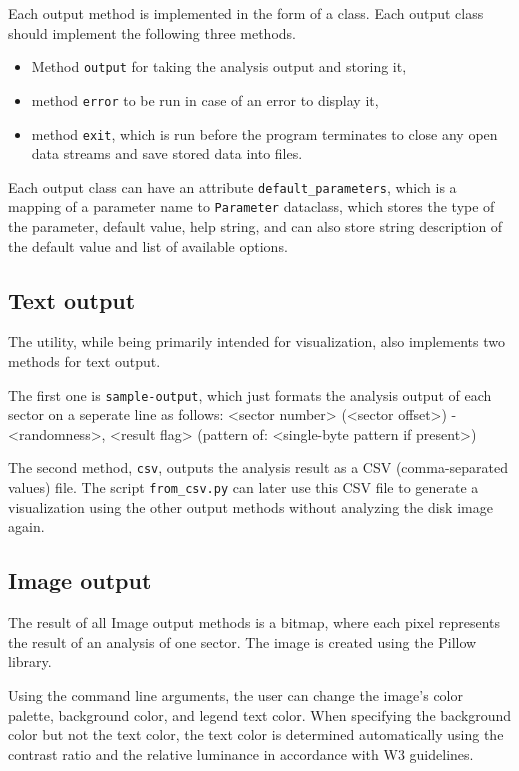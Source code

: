 \documentclass[
  digital, %
  color,   %
  oneside, %
  lof,     %
  nolot,     %
]{fithesis4}
\begin{document}
Each output method is implemented in the form of a class.
Each output class should implement the following three methods.
\begin{itemize}
    \item Method \texttt{output} for taking the analysis output and storing it,
    \item method \texttt{error} to be run in case of an error to display it,
    \item method \texttt{exit}, which is run before the program terminates to close any open data streams and save stored data into files.
\end{itemize}
Each output class can have an attribute \texttt{default\_parameters}, which is a mapping of a parameter name to \texttt{Parameter} dataclass, which stores the type of the parameter, default value, help string, and can also store string description of the default value and list of available options.

\subsection{Text output}
\label{ssec:text-output}

The utility, while being primarily intended for visualization, also implements two methods for text output.

The first one is \texttt{sample-output}, which just formats the analysis output of each sector on a seperate line as follows: <sector number> (<sector offset>) - <randomness>, <result flag> (pattern of: <single-byte pattern if present>)

The second method, \texttt{csv}, outputs the analysis result as a CSV (comma-separated values) file.
The script \texttt{from\_csv.py} can later use this CSV file to generate a visualization using the other output methods without analyzing the disk image again.

\subsection{Image output}
\label{ssec:image-output}

The result of all Image output methods is a bitmap, where each pixel represents the result of an analysis of one sector.
The image is created using the Pillow library.\cite{pillow}

Using the command line arguments, the user can change the image's color palette, background color, and legend text color.
When specifying the background color but not the text color, the text color is determined automatically using the contrast ratio and the relative luminance in accordance with W3 guidelines.\cite{w3guidelines}
\end{document}
